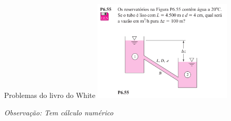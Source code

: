 \documentclass[t,%
brazilian,%
11pt,%
aspectratio=169,%
table%
]{beamer}
\begin{document}
\begin{frame}{Problemas do livro do White}
    \includegraphics[width=0.5\textwidth]{images/Captura de tela de 2025-05-13 17-02-19.png}

    \vspace{\fill}
    \tiny{\textit{Observação: Tem cálculo numérico}}
\end{frame}
\end{document}
